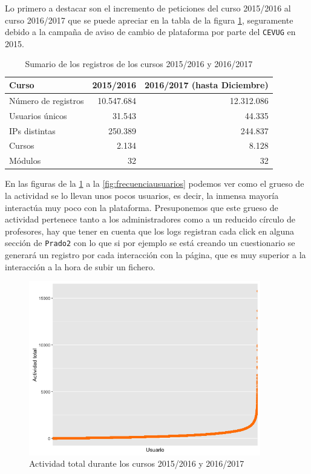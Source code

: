 Lo primero a destacar son el incremento de peticiones del curso 2015/2016 al curso 2016/2017 que se puede apreciar en la tabla de la figura \ref{table:sumarioregistros}, seguramente debido a la campaña de aviso de cambio de plataforma por parte del \texttt{CEVUG} en 2015.

\begin{table}[H]
\centering
\begin{tabular}{|l|r|r|}
\hline
\textbf{Curso}        & \textbf{2015/2016}	& \textbf{2016/2017} (hasta Diciembre)\\ \hline
Número de registros & 10.547.684     		& 12.312.086			\\ \hline
Usuarios únicos     & 31.543        			& 44.335				\\ \hline
IPs distintas       & 250.389       			& 244.837			\\ \hline
Cursos              & 2.134         			& 8.128				\\ \hline
Módulos             & 32            			& 32					\\ \hline
\end{tabular}
\caption{Sumario de los registros de los cursos 2015/2016 y 2016/2017}
\label{table:sumarioregistros}
\end{table}


En las figuras de la \ref{fig:actividadtotal} a la \ref{fig:frecuenciausuarios} podemos ver como el grueso de la actividad se lo llevan unos pocos usuarios, es decir, la inmensa mayoría interactúa muy poco con la plataforma. Presuponemos que este grueso de actividad pertenece tanto a los administradores como a un reducido círculo de profesores, hay que tener en cuenta que los logs registran cada click en alguna sección de \texttt{Prado2} con lo que si por ejemplo se está creando un cuestionario se generará un registro por cada interacción con la página, que es muy superior a la interacción a la hora de subir un fichero.

\begin{figure}[H]
\centering
\includegraphics[width=0.9\textwidth]{../r/actividadtotal}
\caption{Actividad total durante los cursos 2015/2016 y 2016/2017}
\label{fig:actividadtotal}
\end{figure}

